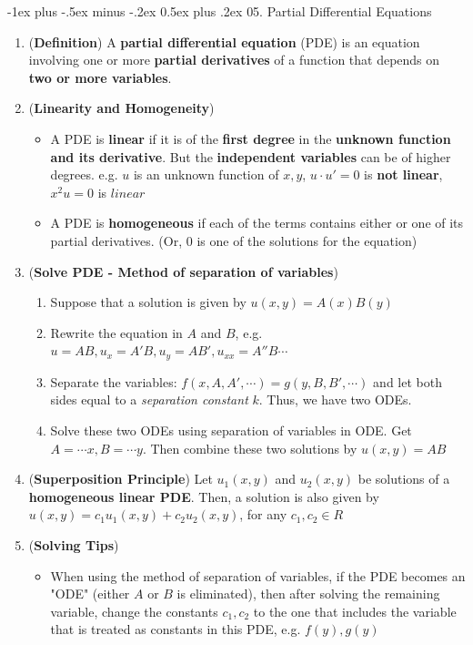 \documentclass[10pt, landscape]{article}
\makeatletter
\renewcommand{\section}{\@startsection{section}{1}{0mm}%
                                {-1ex plus -.5ex minus -.2ex}%
                                {0.5ex plus .2ex}%
                                {\normalfont\large\bfseries}}
\makeatother
\begin{document}
\begin{multicols}{4}
\section{05. Partial Differential Equations}
\begin{enumerate}
    \item (\textbf{Definition}) A \textbf{partial differential equation} (PDE) is an equation involving one or more \textbf{partial derivatives} of a function that depends on \textbf{two or more variables}.
    \item (\textbf{Linearity and Homogeneity})
    \begin{itemize}
        \item A PDE is \textbf{linear} if it is of the \textbf{first degree} in the \textbf{unknown function and its derivative}. But the \textbf{independent variables} can be of higher degrees. e.g. $u$ is an unknown function of $x,y$, $u\cdot u'=0$ is \textbf{not linear}, $x^2u=0$ is $linear$
        \item A PDE is \textbf{homogeneous} if each of the terms contains either or one of its partial derivatives. (Or, 0 is one of the solutions for the equation)
    \end{itemize}
    \item (\textbf{Solve PDE - Method of separation of variables})
    \begin{enumerate}
        \item Suppose that a solution is given by $u(x,y)=A(x)B(y)$
        \item Rewrite the equation in $A$ and $B$, e.g. $u=AB,u_x=A'B,u_y=AB',u_{xx}=A''B\cdots$
        \item Separate the variables: $f(x, A, A',\cdots)=g(y, B, B', \cdots)$ and let both sides equal to a \textit{separation constant} $k$. Thus, we have two ODEs.
        \item Solve these two ODEs using separation of variables in ODE. Get $A=\cdots x, B=\cdots y$. Then combine these two solutions by $u(x,y)=AB$
    \end{enumerate}
    \item (\textbf{Superposition Principle}) Let $u_1(x,y)$ and $u_2(x,y)$ be solutions of a \textbf{homogeneous linear PDE}. Then, a solution is also given by $u(x,y)=c_1u_1(x,y)+c_2u_2(x,y)$, for any $c_1,c_2\in R$
    \item (\textbf{Solving Tips})
    \begin{itemize}
        \item When using the method of separation of variables, if the PDE becomes an "ODE" (either $A$ or $B$ is eliminated), then after solving the remaining variable, change the constants $c_1,c_2$ to the one that includes the variable that is treated as constants in this PDE, e.g. $f(y), g(y)$
    \end{itemize}
\end{enumerate}

\end{multicols}
\end{document}
